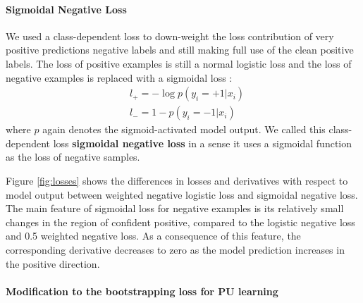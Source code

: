 \paragraph{Sigmoidal Negative Loss}

We used a class-dependent loss to down-weight the loss contribution of very positive predictions negative labels and still making full use of the clean positive labels.
The loss of positive examples is still a normal logistic loss and the loss of negative examples is replaced with a sigmoidal loss  \cite{tax2016class}:
\begin{equation*}
  \begin{aligned}
    & l_{+} = - \log p(y_i=+1 \vert x_i) \\
    & l_{-} = 1 - p(y_i=-1|x_i)
  \end{aligned}
\end{equation*}
where $p$ again denotes the sigmoid-activated model output.
We called this class-dependent loss \textbf{sigmoidal negative loss} in a sense it uses a sigmoidal function as the loss of negative samples.

Figure \ref{fig:losses} shows the differences in losses and derivatives with respect to model output between weighted negative logistic loss and sigmoidal negative loss.
The main feature of sigmoidal loss for negative examples is its relatively small changes in the region of confident positive, compared to the logistic negative loss and 0.5 weighted negative loss.
As a consequence of this feature, the corresponding derivative decreases to zero as the model prediction increases in the positive direction.


\paragraph{Modification to the bootstrapping loss for PU learning}

